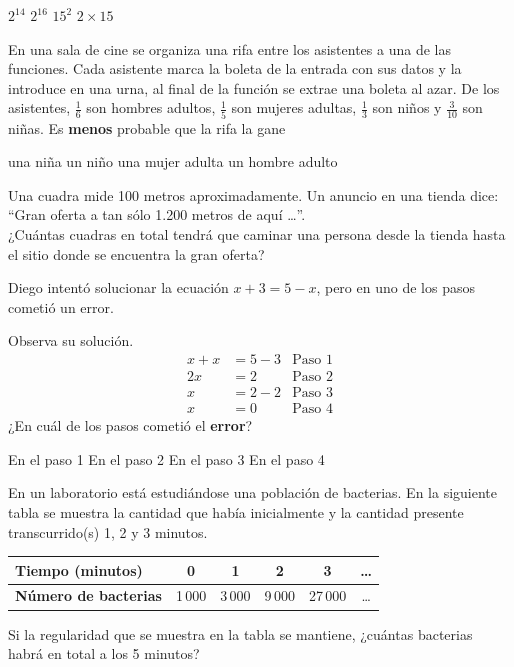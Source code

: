 \documentclass[10pt,letterpaper,addpoints]{exam}
\begin{document}
\begin{questions}
\begin{oneparchoices}
\CorrectChoice $2^{14}$
\choice $2^{16}$
\choice $15^{2}$
\choice $2\times 15$
\end{oneparchoices}
\question En una sala de cine se organiza una rifa entre los asistentes a una de las funciones. Cada asistente marca la boleta de la entrada con sus datos y la introduce en una urna, al final de la función se extrae una boleta al azar. De los asistentes, $\frac{1}{6}$ son hombres adultos, $\frac{1}{5}$ son mujeres adultas, $\frac{1}{3}$ son niños y  $\frac{3}{10}$     son niñas. Es \textbf{menos} probable que la rifa la gane

\begin{oneparchoices}
\choice una niña
\choice un niño
\choice una mujer adulta
\CorrectChoice un hombre adulto
\end{oneparchoices}
\question Una cuadra mide 100 metros aproximadamente. Un anuncio en una tienda dice: “Gran oferta a tan sólo 1.200 metros de aquí \ldots ”.\\ 

¿Cuántas cuadras en total tendrá que caminar una persona desde la tienda hasta el sitio donde se encuentra la gran oferta?

\begin{oneparchoices}
\end{oneparchoices}
\question Diego intentó solucionar la ecuación $x + 3 = 5 - x$, pero en uno de los pasos cometió un error.

Observa su solución.
\begin{align*}
 x+x&=5-3 & \mbox{Paso 1}\\
 2x&=2 & \mbox{Paso 2}\\
  x&=2-2 & \mbox{Paso 3}\\
  x&=0 & \mbox{Paso 4}
\end{align*}
¿En cuál de los pasos cometió el \textbf{error}?

\begin{oneparchoices}
\choice En el paso 1
\choice En el paso 2
\CorrectChoice En el paso 3
\choice En el paso 4
\end{oneparchoices}
\question En un laboratorio está estudiándose una población de bacterias. En la siguiente tabla se muestra la cantidad que había inicialmente y la cantidad presente transcurrido(s) 1, 2 y 3 minutos.
\begin{center}
\begin{tabular}{|p{2cm}|c|c|c|c|c|}
\hline 
\textbf{Tiempo (minutos)} & \textbf{0} & \textbf{1} & \textbf{2} & \textbf{3} & \textbf{\ldots} \\ 
\hline 
\textbf{Número de bacterias} & 1\,000 & 3\,000 & 9\,000 & 27\,000 & \ldots \\ 
\hline 
\end{tabular} 
\end{center}
Si la regularidad que se muestra en la tabla se mantiene, ¿cuántas bacterias habrá en total a los 5 minutos?


\end{questions}
\end{document}
